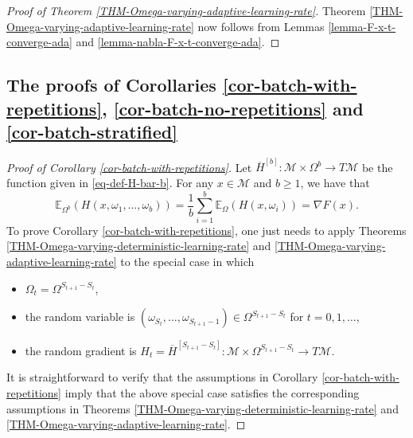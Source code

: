 \documentclass{amsart}
\newcommand{\E}{\mathbb{E}}
\newcommand{\M}{\mathcal{M}}
\theoremstyle{plain}
\theoremstyle{definition}
\theoremstyle{remark}
\numberwithin{theorem}{section}
\numberwithin{equation}{section}
\begin{document}
\begin{proof}[Proof of Theorem \ref{THM-Omega-varying-adaptive-learning-rate}]
Theorem \ref{THM-Omega-varying-adaptive-learning-rate} now follows from Lemmas \ref{lemma-F-x-t-converge-ada} and \ref{lemma-nabla-F-x-t-converge-ada}.
\end{proof}

\subsection{The proofs of Corollaries \ref{cor-batch-with-repetitions}, \ref{cor-batch-no-repetitions} and \ref{cor-batch-stratified}}

\begin{proof}[Proof of Corollary \ref{cor-batch-with-repetitions}]
Let $\overline{H}^{[b]}:\M \times \Omega^{b} \rightarrow T\M$ be the function given in \eqref{eq-def-H-bar-b}. For any $x \in \M$ and $b\geq 1$, we have that 
\[
\E_{\Omega^b}(H(x, \omega_1,\dots,\omega_b)) = \frac{1}{b}\sum_{i=1}^b\E_{\Omega}(H(x,\omega_i))= \nabla F(x).
\]
To prove Corollary \ref{cor-batch-with-repetitions}, one just needs to apply Theorems \ref{THM-Omega-varying-deterministic-learning-rate} and \ref{THM-Omega-varying-adaptive-learning-rate} to the special case in which
\begin{itemize}
	\item $\Omega_t = \Omega^{S_{t+1}-S_t}$,
	\item the random variable is $(\omega_{S_t},\dots,\omega_{S_{t+1}-1}) \in  \Omega^{S_{t+1}-S_t}$ for $t=0,1,\dots$,
	\item the random gradient is $H_t = \overline{H}^{[S_{t+1}-S_t]}: \M \times \Omega^{S_{t+1}-S_t} \rightarrow T\M$.
\end{itemize}
It is straightforward to verify that the assumptions in Corollary \ref{cor-batch-with-repetitions} imply that the above special case satisfies the corresponding assumptions in Theorems \ref{THM-Omega-varying-deterministic-learning-rate} and \ref{THM-Omega-varying-adaptive-learning-rate}.
\end{proof}
\end{document}
